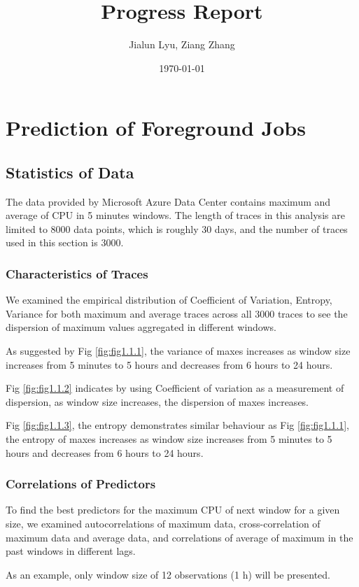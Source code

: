 \documentclass{article}
\title{Progress Report}
\author{Jialun Lyu, Ziang Zhang}
\date{\today}
\begin{document}
\maketitle

\section{Prediction of Foreground Jobs}

\subsection{Statistics of Data}

\begin{flushleft}
The data provided by Microsoft Azure Data Center contains maximum and average of CPU in 5 minutes windows. The length of traces in this analysis are limited to 8000 data points, which is roughly 30 days, and the number of traces used in this section is 3000. 
\end{flushleft}

\subsubsection{Characteristics of Traces}

\begin{flushleft}
We examined the empirical distribution of Coefficient of Variation, Entropy, Variance for both maximum and average traces across all 3000 traces to see the dispersion of maximum values aggregated in different windows.
\end{flushleft}


\begin{flushleft}
As suggested by Fig \ref{fig:fig1.1.1}, the variance of maxes increases as window size increases from 5 minutes to 5 hours and decreases from 6 hours to 24 hours.

Fig \ref{fig:fig1.1.2} indicates by using Coefficient of variation as a measurement of dispersion, as window size increases, the dispersion of maxes increases.

Fig \ref{fig:fig1.1.3}, the entropy demonstrates similar behaviour as Fig \ref{fig:fig1.1.1}, the entropy of maxes increases as window size increases from 5 minutes to 5 hours and decreases from 6 hours to 24 hours.
\end{flushleft}

\subsubsection{Correlations of Predictors}
\begin{flushleft}
To find the best predictors for the maximum CPU of next window for a given size, we examined autocorrelations of maximum data, cross-correlation of maximum data and average data, and correlations of average of maximum in the past windows in different lags.

As an example, only window size of 12 observations (1 h) will be presented.
\end{flushleft}
\end{document}
